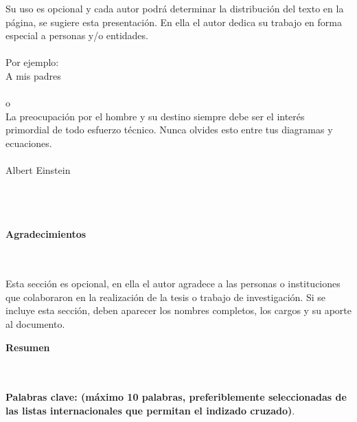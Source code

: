 \begin{flushright}
\begin{minipage}{8cm}
    \noindent
        \small
        Su uso es opcional y cada autor podr\'{a} determinar la distribuci\'{o}n del texto en la p\'{a}gina, se sugiere esta presentaci\'{o}n. En ella el autor dedica su trabajo en forma especial a personas y/o entidades.\\[1.0cm]\\
        Por ejemplo:\\[1.0cm]
        A mis padres\\[1.0cm]\\
        o\\[1.0cm]
        La preocupaci\'{o}n por el hombre y su destino siempre debe ser el
        inter\'{e}s primordial de todo esfuerzo t\'{e}cnico. Nunca olvides esto
        entre tus diagramas y ecuaciones.\\\\
        Albert Einstein\\
\end{minipage}
\end{flushright}

\newpage{\pagestyle{empty}\cleardoublepage}

\newpage
\thispagestyle{empty} \textbf{}\normalsize
\\\\\\%
\textbf{\LARGE Agradecimientos}
\\\\
Esta secci\'{o}n es opcional, en ella el autor agradece a las personas o instituciones que colaboraron en la realizaci\'{o}n de la tesis  o trabajo de investigaci\'{o}n. Si se incluye esta secci\'{o}n, deben aparecer los nombres completos, los cargos y su aporte al documento.\\

\newpage{\pagestyle{empty}\cleardoublepage}

\newpage
\textbf{\LARGE Resumen}
\\\\

\textbf{\small Palabras clave: (m\'{a}ximo 10 palabras, preferiblemente seleccionadas de las listas internacionales que permitan el indizado cruzado)}.\\

